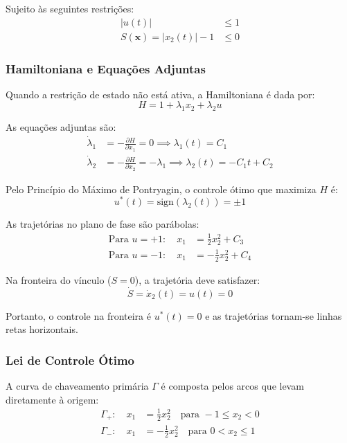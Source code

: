 \documentclass[a4paper, 12pt]{article}%
\begin{document}
Sujeito às seguintes restrições:
\begin{align}
    |u(t)| &\le 1 \\
    S(\mathbf{x}) = |x_2(t)| - 1 &\le 0
\end{align}

\subsubsection*{Hamiltoniana e Equações Adjuntas}
Quando a restrição de estado não está ativa, a Hamiltoniana é dada por:
\begin{equation}
    H = 1 + \lambda_1 x_2 + \lambda_2 u
\end{equation}

As equações adjuntas são:
\begin{align}
    \dot{\lambda}_1 &= -\frac{\partial H}{\partial x_1} = 0 \implies \lambda_1(t) = C_1 \\
    \dot{\lambda}_2 &= -\frac{\partial H}{\partial x_2} = - \lambda_1 \implies \lambda_2(t) = -C_1 t + C_2
\end{align}

Pelo Princípio do Máximo de Pontryagin, o controle ótimo que maximiza $H$ é:
\begin{equation}
u^*(t) = \text{sign}(\lambda_2(t)) = \pm 1
\end{equation}

As trajetórias no plano de fase são parábolas:
\begin{align}
    \text{Para } u = +1: \quad x_1 &= \frac{1}{2}x_2^2 + C_3 \\
    \text{Para } u = -1: \quad x_1 &= -\frac{1}{2}x_2^2 + C_4
\end{align}

Na fronteira do vínculo ($S = 0$), a trajetória deve satisfazer:
\begin{equation}
    \dot{S} = \dot{x}_2(t) = u(t) = 0
\end{equation}

Portanto, o controle na fronteira é $u^*(t) = 0$ e as trajetórias tornam-se linhas retas horizontais.

\subsubsection*{Lei de Controle Ótimo}
A curva de chaveamento primária $\Gamma$ é composta pelos arcos que levam diretamente à origem:
\begin{align}
\Gamma_+: \quad x_1 &= \frac{1}{2}x_2^2 \quad \text{para } -1 \le x_2 < 0 \\
\Gamma_-: \quad x_1 &= -\frac{1}{2}x_2^2 \quad \text{para } 0 < x_2 \le 1
\end{align}
\end{document}
